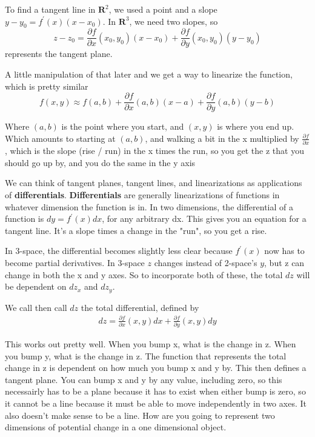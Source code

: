 \documentclass[12pt, letterpaper]{article}
\begin{document}
To find a tangent line in $\textbf{R}^2$, we used a point and a slope $y - y_0 = f^\prime (x)(x-x_0)$. In $\textbf{R}^3$, we need two slopes, so 
\begin{displaymath}
    z - z_0 = \frac{\partial f}{\partial x}(x_0, y_0)(x - x_0) + \frac{\partial f}{\partial y}(x_0, y_0)(y - y_0)
\end{displaymath}
represents the tangent plane.

A little manipulation of that later and we get a way to linearize the function, which is pretty similar
\begin{displaymath}
    f(x, y) \approx f(a, b) + \frac{\partial f}{\partial x}(a, b)(x - a) + \frac{\partial f}{\partial y}(a, b)(y - b)
\end{displaymath}

Where $(a, b)$ is the point where you start, and $(x, y)$ is where you end up. Which amounts to starting at $(a, b)$, and walking a bit in the x multiplied by $\frac{\partial f}{\partial x}$, which is the slope (rise / run) in the x times the run, so you get the z that you should go up by, and you do the same in the y axis

We can think of tangent planes, tangent lines, and linearizations as applications of \textbf{differentials}. \textbf{Differentials} are generally linearizations of functions in whatever dimension the function is in. In two dimensions, the differential of a function is $dy = f^\prime (x)dx$, for any arbitrary dx. This gives you an equation for a tangent line. It's a slope times a change in the "run", so you get a rise.

In 3-space, the differential becomes slightly less clear because $f^\prime (x)$ now has to become partial derivatives. In 3-space $z$ changes instead of 2-space's $y$, but z can change in both the x and y axes. So to incorporate both of these, the total $dz$ will be dependent on $dz_x$ and $dz_y$.

We call then call $dz$ the total differential, defined by
\begin{gather*}
    dz = \frac{\partial f}{\partial x}(x, y)dx + \frac{\partial f}{\partial y}(x, y)dy  
\end{gather*}

This works out pretty well. When you bump x, what is the change in z. When you bump y, what is the change in z. The function that represents the total change in z is dependent on how much you bump x and y by. This then defines a tangent plane. You can bump x and y by any value, including zero, so this necessairly has to be a plane because it has to exist when either bump is zero, so it cannot be a line because it must be able to move independently in two axes. It also doesn't make sense to be a line. How are you going to represent two dimensions of potential change in a one dimensional object.
\end{document}
